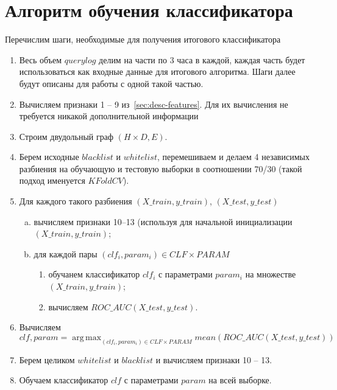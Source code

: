 \documentclass[a4paper,14pt]{extreport} %
\DeclareMathOperator*{\argmaxA}{arg\,max}
\begin{document}
\section{Алгоритм обучения классификатора}
Перечислим шаги, необходимые для получения итогового классификатора
\begin{enumerate}
	\item Весь объем $querylog$ делим на части по 3 часа в каждой, каждая часть будет использоваться как входные данные для итогового алгоритма. Шаги далее будут описаны для работы с одной такой частью.
	      	      	      	
	\item Вычисляем признаки 1 -- 9 из~\ref{sec:desc-features}. Для их вычисления не требуется никакой дополнительной информации
	      	      	      	
	\item Строим двудольный граф $(H \times D, E)$.
	      	      	      	
	\item Берем исходные $blacklist$ и $whitelist$, перемешиваем и делаем 4 независимых разбиения на обучающую и тестовую выборки в соотношении 70/30 
	      (такой подход именуется $KFold CV$).
	      	      	      	
	\item Для каждого такого разбиения $(X\_train, y\_train)$, $(X\_test, y\_test)$
	      \begin{enumerate}[a)]
	      	\item вычисляем признаки 10--13 (используя для начальной инициализации $(X\_train, y\_train)$;
	      	\item для каждой пары $(clf_i, param_i) \in CLF\times PARAM$
	      	      \begin{enumerate}[-]
	      	      	\item обучанем классификатор $clf_i$ с параметрами $param_i$ на множестве $(X\_train, y\_train)$;
	      	      	\item вычисляем $ROC\_AUC(X\_test, y\_test)$.
	      	      \end{enumerate}
	      	      	      	      	      	      	
	      \end{enumerate}
	      	      	      	
	\item Вычисляем
	      \begin{equation}
	      	\label{eq:clf-opt}
	      	clf, param = \argmaxA_{(clf_i, param_i) \in CLF\times PARAM}mean(ROC\_AUC(X\_test, y\_test))
	      \end{equation}
	\item Берем целиком $whitelist$ и $blacklist$ и вычисляем признаки 10 -- 13.
	\item Обучаем классификатор $clf$ с параметрами $param$ на всей выборке.
\end{enumerate}
	
\end{document}
